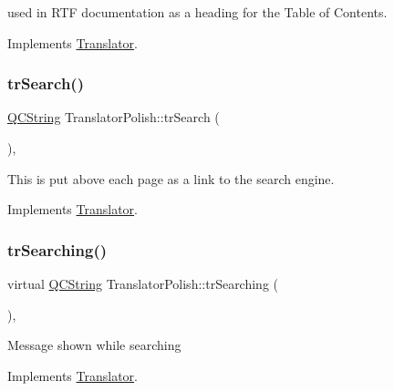 used in R\+TF documentation as a heading for the Table of Contents. 

Implements \mbox{\hyperlink{class_translator}{Translator}}.

\mbox{\label{class_translator_polish_abe0e787a56fad65f83063efce0ced680}} 
\subsubsection{\texorpdfstring{trSearch()}{trSearch()}}
{\footnotesize\ttfamily \mbox{\hyperlink{class_q_c_string}{Q\+C\+String}} Translator\+Polish\+::tr\+Search (\begin{DoxyParamCaption}{ }\end{DoxyParamCaption})\hspace{0.3cm}{\ttfamily [inline]}, {\ttfamily [virtual]}}

This is put above each page as a link to the search engine. 

Implements \mbox{\hyperlink{class_translator}{Translator}}.

\mbox{\label{class_translator_polish_ab4ed6048856e6dbabeeb8ed58722d7df}} 
\subsubsection{\texorpdfstring{trSearching()}{trSearching()}}
{\footnotesize\ttfamily virtual \mbox{\hyperlink{class_q_c_string}{Q\+C\+String}} Translator\+Polish\+::tr\+Searching (\begin{DoxyParamCaption}{ }\end{DoxyParamCaption})\hspace{0.3cm}{\ttfamily [inline]}, {\ttfamily [virtual]}}

Message shown while searching 

Implements \mbox{\hyperlink{class_translator}{Translator}}.

\mbox{\label{class_translator_polish_abef8d4d24996c6ab78698f8b2763d406}} 
